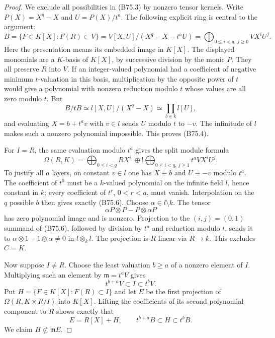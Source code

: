 \begin{proof}
We exclude all possibilities in (B75.3) by nonzero tensor kernels.
Write $P(X)=X^q-X$ and $U=P(X)/t^a$. The following explicit ring is
central to the argument:
\[
 B=\{F\in K[X]:F(R)\subset V\}
   =V[X,U]/(X^q-X-t^aU)
   =\bigoplus_{0\le i<q,\ j\ge0}VX^iU^j.                 \tag{B75.4}
\]
Here the presentation means its embedded image in $K[X]$.
The displayed monomials are a $K$-basis of $K[X]$, by successive
division by the monic $P$. They all preserve $R$ into $V$.
If an integer-valued polynomial had a coefficient of negative minimum
$t$-valuation in this basis, multiplication by the opposite power of
$t$ would give a polynomial with nonzero reduction modulo $t$ whose
values are all zero modulo $t$. But
\[
 B/tB\simeq l[X,U]/(X^q-X)\simeq\prod_{b\in k}l[U],       \tag{B75.5}
\]
and evaluating $X=b+t^av$ with $v\in l$ sends $U$ modulo $t$ to $-v$.
The infinitude of $l$ makes such a nonzero polynomial impossible.
This proves (B75.4).

For $I=R$, the same evaluation modulo $t^a$ gives the split module
formula
\[
 \Omega(R,K)=
 \bigoplus_{0\le i<q}RX^i
 \ \oplus\!!\bigoplus_{0\le i<q,\ j\ge1}t^aVX^iU^j.     \tag{B75.6}
\]
To justify all $a$ layers, on constant $v\in l$ one has
$X\equiv b$ and $U\equiv-v$ modulo $t^a$.
The coefficient of $t^0$ must be a $k$-valued polynomial on the
infinite field $l$, hence constant in $k$; every coefficient of
$t^r$, $0<r<a$, must vanish. Interpolation on the $q$ possible $b$
then gives exactly (B75.6).
Choose $\alpha\in l\setminus k$. The tensor
\[
                  \alpha P\otimes P-P\otimes\alpha P     \tag{B75.7}
\]
has zero polynomial image and is nonzero. Projection to the
$(i,j)=(0,1)$ summand of (B75.6), followed by division by $t^a$ and
reduction modulo $t$, sends it to
$\alpha\otimes1-1\otimes\alpha\ne0$ in $l\otimes_k l$.
The projection is $R$-linear via $R\to k$. This excludes $C=K$.

Now suppose $I\ne R$. Choose the least valuation $b\ge a$ of a
nonzero element of $I$. Multiplying such an element by
$\mathfrak m=t^aV$ gives
\[
                      t^{b+a}V\subset I\subset t^bV.
\]
Put $H=\{F\in K[X]:F(R)\subset I\}$ and let $E$ be the first projection
of $\Omega(R,K\times R/I)$ into $K[X]$. Lifting the coefficients of
its second polynomial component to $R$ shows exactly that
\[
                  E=R[X]+H,\qquad
                  t^{b+a}B\subset H\subset t^bB.           \tag{B75.8}
\]
We claim $H\not\subset\mathfrak mE$.


\end{proof}
